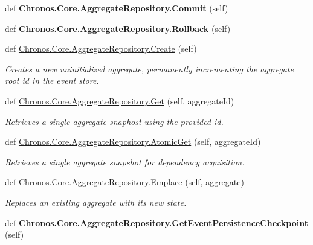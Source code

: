 \begin{DoxyCompactItemize}
\item 
def {\bfseries Chronos.\+Core.\+Aggregate\+Repository.\+Commit} (self)\hypertarget{group__Chronos_gab1c1f0c84795fcb12900a5060c1c5885}{}\label{group__Chronos_gab1c1f0c84795fcb12900a5060c1c5885}

\item 
def {\bfseries Chronos.\+Core.\+Aggregate\+Repository.\+Rollback} (self)\hypertarget{group__Chronos_ga7b843d19e9a13d5cec044cb7702fee5d}{}\label{group__Chronos_ga7b843d19e9a13d5cec044cb7702fee5d}

\item 
def \hyperlink{group__Chronos_ga631476634e37f9961dba1bb160bb9ee5}{Chronos.\+Core.\+Aggregate\+Repository.\+Create} (self)
\begin{DoxyCompactList}\small\item\em Creates a new uninitialized aggregate, permanently incrementing the aggregate root id in the event store. \end{DoxyCompactList}\item 
def \hyperlink{group__Chronos_ga8b9bae0731e091c9f2a79803149f5449}{Chronos.\+Core.\+Aggregate\+Repository.\+Get} (self, aggregate\+Id)
\begin{DoxyCompactList}\small\item\em Retrieves a single aggregate snaphost using the provided id. \end{DoxyCompactList}\item 
def \hyperlink{group__Chronos_ga21a75e7e033c6cf88ac47d6525f8c991}{Chronos.\+Core.\+Aggregate\+Repository.\+Atomic\+Get} (self, aggregate\+Id)
\begin{DoxyCompactList}\small\item\em Retrieves a single aggregate snapshot for dependency acquisition. \end{DoxyCompactList}\item 
def \hyperlink{group__Chronos_ga5034ab423a49b011e6f90460ddd4e70e}{Chronos.\+Core.\+Aggregate\+Repository.\+Emplace} (self, aggregate)
\begin{DoxyCompactList}\small\item\em Replaces an existing aggregate with its new state. \end{DoxyCompactList}\item 
def {\bfseries Chronos.\+Core.\+Aggregate\+Repository.\+Get\+Event\+Persistence\+Checkpoint} (self)\hypertarget{group__Chronos_gaee8da4fcbc60d7f34989e399e8ac16ec}{}\label{group__Chronos_gaee8da4fcbc60d7f34989e399e8ac16ec}


\end{DoxyCompactItemize}
